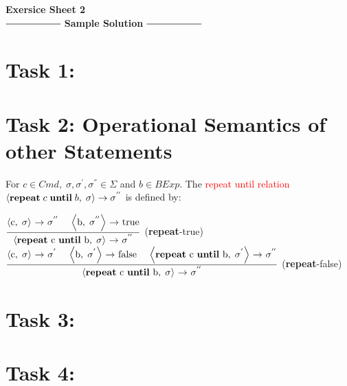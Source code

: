 \documentclass[12pt,a4paper]{article}
\newcommand{\eRelation}[2]{$\dfrac{\text{#1}}{\text{#2}}$}
\newcommand{\eState}[2]{$\left< \text{#1},\; \text{#2}\right>$}
\newcommand{\eRule}[3]{\eState{#1}{#2} $\rightarrow$ #3}
\begin{document}
	\begin{center}
		\huge\textbf{Exersice Sheet 2}\\[0.5cm]
	
		\Large
		$\mathrel{\vcenter{\hbox{\rule{2cm}{0.5pt}}}}$ \textbf{Sample 				Solution} $\mathrel{\vcenter{\hbox{\rule{2cm}{0.5pt}}}}$\\[1cm]
	\end{center}
\large
	\section*{Task 1:}
	\section*{Task 2: Operational Semantics of other Statements}
		\indent\indent For $c\in Cmd,\; \sigma , \sigma ^{'}, \sigma ^{''} \in \Sigma$ and $b\in BExp$. The \textcolor{red}{repeat until relation}\\\indent $\left< \text{\textbf{repeat}}\; c\; \text{\textbf{until}}\; b,\; \sigma \right> \rightarrow \sigma ^{''}$ is defined by:\\
		
		\begin{center}
			\eRelation
				{\eRule{c}{$\sigma$}{$\sigma ^{''}$ \quad \eRule{b}{$\sigma ^{''}$}{true}}}
				{\eRule{\textbf{repeat} c \textbf{until} b}{$\sigma$}{$\sigma ^{''}$}}
			(\textbf{repeat}-true)\\[0.75cm]
			\eRelation
				{\eRule{c}{$\sigma$}{$\sigma ^{'}$} \quad \eRule{b}{$\sigma ^{'}$}{false} \quad \eRule{\textbf{repeat} c \textbf{until} b}{$\sigma ^{'}$}{$\sigma ^{''}$}}
				{\eRule{\textbf{repeat} c \textbf{until} b}{$\sigma$}{$\sigma ^{''}$}}
			(\textbf{repeat}-false)\\
		\end{center}
	\section*{Task 3:}
	\section*{Task 4:}
\end{document}
